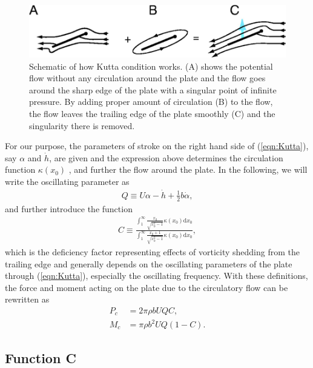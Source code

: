 \begin{figure}
\begin{center}
 \includegraphics[width=14cm]{Figures/theodorsen/KuttaCondition.png}
\end{center}
\caption[Schematic of Kutta condition]{Schematic of how Kutta condition works. (A) shows the potential flow without any circulation around the plate and the flow goes around the sharp edge of the plate with a singular point of infinite pressure. By adding proper amount of circulation (B) to the flow, the flow leaves the trailing edge of the plate smoothly (C) and the singularity there is removed.}
\label{fig:KuttaCondition}
\end{figure}

For our purpose, the parameters of stroke on the right hand side of (\eqref{eqn:Kutta}), say $\alpha$ and $\dot{h}$, are given and the expression above determines the circulation function $\kappa(x_0)$ , and further the flow around the plate. 
In the following, we will write the oscillating parameter as
\begin{align}
Q \equiv U \alpha - \dot{h} + \frac{1}{2}b\dot{\alpha},
\end{align}
and further introduce the function
\begin{align}
C \equiv \frac{\int_{1}^{\infty} \frac{x_0}{\sqrt{x_0^2-1}} \kappa(x_0) \mathrm{d}x_0}{\int_{1}^{\infty} \frac{x_0+1}{\sqrt{x_0^2-1}} \kappa(x_0) \mathrm{d}x_0},
\end{align}
which is the deficiency factor representing effects of vorticity shedding from the trailing edge and generally depends on the oscillating parameters of the plate through (\ref{eqn:Kutta}), especially the oscillating frequency.
With these definitions, the force and moment acting on the plate due to the circulatory flow can be rewritten as
\begin{align}
P_c & = 2\pi \rho b U Q C,  \\
M_c & = \pi \rho b^2 U Q (1 - C).
\end{align}

\subsection{Function C}

